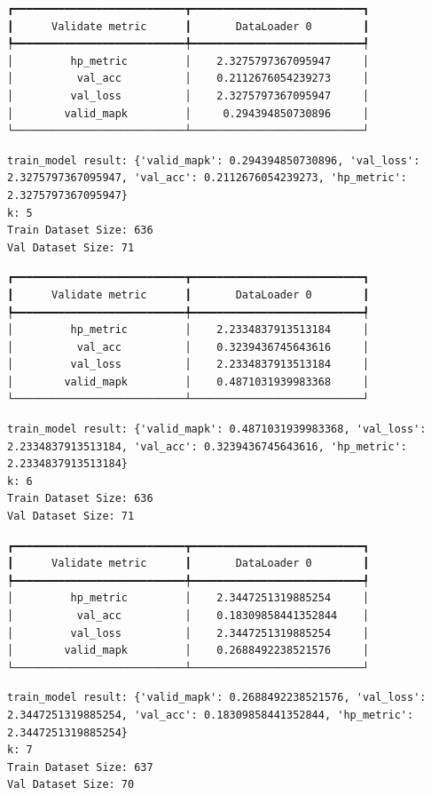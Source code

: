 \documentclass[
  letterpaper,
  DIV=11,
  numbers=noendperiod]{scrreprt}
\begin{document}
\begin{verbatim}
┏━━━━━━━━━━━━━━━━━━━━━━━━━━━┳━━━━━━━━━━━━━━━━━━━━━━━━━━━┓
┃      Validate metric      ┃       DataLoader 0        ┃
┡━━━━━━━━━━━━━━━━━━━━━━━━━━━╇━━━━━━━━━━━━━━━━━━━━━━━━━━━┩
│         hp_metric         │    2.3275797367095947     │
│          val_acc          │    0.2112676054239273     │
│         val_loss          │    2.3275797367095947     │
│        valid_mapk         │     0.294394850730896     │
└───────────────────────────┴───────────────────────────┘
\end{verbatim}

\begin{verbatim}
train_model result: {'valid_mapk': 0.294394850730896, 'val_loss': 2.3275797367095947, 'val_acc': 0.2112676054239273, 'hp_metric': 2.3275797367095947}
k: 5
Train Dataset Size: 636
Val Dataset Size: 71
\end{verbatim}

\begin{verbatim}
┏━━━━━━━━━━━━━━━━━━━━━━━━━━━┳━━━━━━━━━━━━━━━━━━━━━━━━━━━┓
┃      Validate metric      ┃       DataLoader 0        ┃
┡━━━━━━━━━━━━━━━━━━━━━━━━━━━╇━━━━━━━━━━━━━━━━━━━━━━━━━━━┩
│         hp_metric         │    2.2334837913513184     │
│          val_acc          │    0.3239436745643616     │
│         val_loss          │    2.2334837913513184     │
│        valid_mapk         │    0.4871031939983368     │
└───────────────────────────┴───────────────────────────┘
\end{verbatim}

\begin{verbatim}
train_model result: {'valid_mapk': 0.4871031939983368, 'val_loss': 2.2334837913513184, 'val_acc': 0.3239436745643616, 'hp_metric': 2.2334837913513184}
k: 6
Train Dataset Size: 636
Val Dataset Size: 71
\end{verbatim}

\begin{verbatim}
┏━━━━━━━━━━━━━━━━━━━━━━━━━━━┳━━━━━━━━━━━━━━━━━━━━━━━━━━━┓
┃      Validate metric      ┃       DataLoader 0        ┃
┡━━━━━━━━━━━━━━━━━━━━━━━━━━━╇━━━━━━━━━━━━━━━━━━━━━━━━━━━┩
│         hp_metric         │    2.3447251319885254     │
│          val_acc          │    0.18309858441352844    │
│         val_loss          │    2.3447251319885254     │
│        valid_mapk         │    0.2688492238521576     │
└───────────────────────────┴───────────────────────────┘
\end{verbatim}

\begin{verbatim}
train_model result: {'valid_mapk': 0.2688492238521576, 'val_loss': 2.3447251319885254, 'val_acc': 0.18309858441352844, 'hp_metric': 2.3447251319885254}
k: 7
Train Dataset Size: 637
Val Dataset Size: 70
\end{verbatim}
\end{document}
